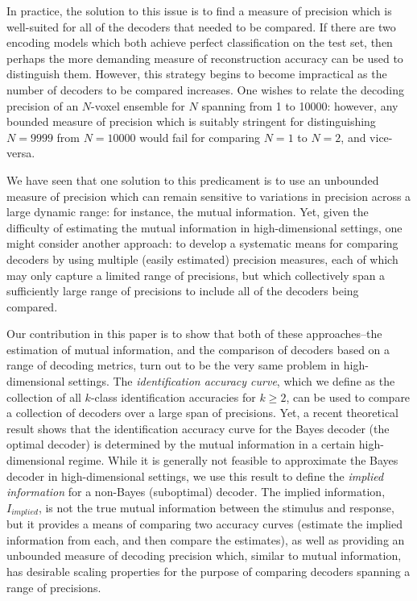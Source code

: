\documentclass[12pt]{article}
\begin{document}
In practice, the solution to this issue is to find a measure of
precision which is well-suited for all of the decoders that needed to
be compared.  If there are two encoding models which both achieve
perfect classification on the test set, then perhaps the more
demanding measure of reconstruction accuracy can be used to
distinguish them.  However, this strategy begins to become impractical
as the number of decoders to be compared increases.  One wishes to
relate the decoding precision of an $N$-voxel ensemble for $N$
spanning from 1 to 10000: however, any bounded measure of precision
which is suitably stringent for distinguishing $N=9999$ from $N=10000$
would fail for comparing $N=1$ to $N=2$, and vice-versa.

We have seen that one solution to this predicament is to use an
unbounded measure of precision which can remain sensitive to
variations in precision across a large dynamic range: for instance,
the mutual information.  Yet, given the difficulty of estimating the
mutual information in high-dimensional settings, one might consider
another approach: to develop a systematic means for comparing decoders
by using multiple (easily estimated) precision measures, each of which
may only capture a limited range of precisions, but which collectively
span a sufficiently large range of precisions to include all of the
decoders being compared.  

Our contribution in this paper is to show
that both of these approaches--the estimation of mutual information,
and the comparison of decoders based on a range of decoding metrics,
turn out to be the very same problem in high-dimensional settings.
The \emph{identification accuracy curve}, which we define as the
collection of all $k$-class identification accuracies for $k \geq 2$,
can be used to compare a collection of decoders over a large span of
precisions.  Yet, a recent theoretical result\cite{Zheng2016} shows
that the identification accuracy curve for the Bayes decoder (the
optimal decoder) is determined by the mutual information in a certain
high-dimensional regime.  While it is generally not feasible to
approximate the Bayes decoder in high-dimensional settings, we use
this result to define the \emph{implied information} for a non-Bayes
(suboptimal) decoder.  The implied information, $I_{implied}$, is not
the true mutual information between the stimulus and response, but it
provides a means of comparing two accuracy curves (estimate the
implied information from each, and then compare the estimates), as
well as providing an unbounded measure of decoding precision which,
similar to mutual information, has desirable scaling properties for
the purpose of comparing decoders spanning a range of precisions.
\end{document}
